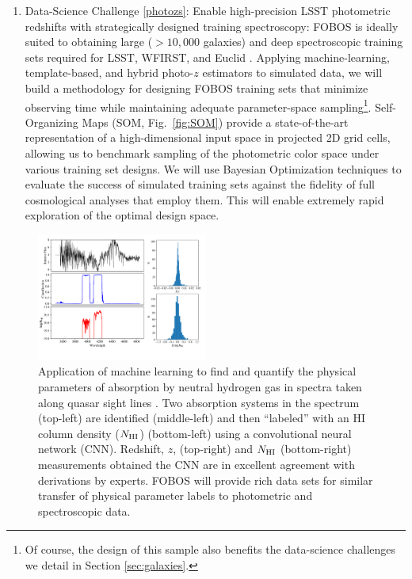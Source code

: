 \documentclass[oneside,11pt]{amsart}
\newcounter{chalno}
\newcommand{\chal}[1]{\refstepcounter{chalno}\label{#1}}
\begin{document}
\chal{photozs}
%
\begin{enumerate}[rightmargin=0.2cm,leftmargin=0.2cm]
%
\item[] {\textsf {\large Data-Science Challenge \ref{photozs}: Enable
high-precision LSST photometric redshifts with strategically designed
training spectroscopy:}}  FOBOS is ideally suited to obtaining large
($>10,000$ galaxies) and deep spectroscopic training sets required for
LSST, WFIRST, and Euclid \citep[see][] {newman15}.  Applying
machine-learning, template-based, and hybrid photo-$z$ estimators to
simulated data, we will build a methodology for designing FOBOS training
sets that minimize observing time while maintaining adequate
parameter-space sampling\footnote{
%
Of course, the design of this sample also benefits the data-science
challenges we detail in Section \ref{sec:galaxies}.}.
%
Self-Organizing Maps (SOM, Fig.~\ref {fig:SOM}) provide a
state-of-the-art representation of a high-dimensional input space in
projected 2D grid cells, allowing us to benchmark sampling of the
photometric color space under various training set designs.  We will use
Bayesian Optimization techniques to evaluate the success of simulated training sets against the fidelity of full  
cosmological analyses that employ them.  This will enable extremely rapid exploration of the
optimal design space.

\end{enumerate}

\begin{figure}\small
%
\includegraphics[width=0.5\textwidth]{figs/Parks_fig.pdf}
%
\caption{Application of machine learning to find and quantify the
physical parameters of absorption by neutral hydrogen gas in spectra
taken along quasar sight lines \citep[adapted from Figs 7 and 14
from][]{parks18}.  Two absorption systems in the spectrum (top-left) are
identified (middle-left) and then ``labeled'' with an HI column density
($N_{\rm HI}$) (bottom-left) using a convolutional neural network (CNN).
Redshift, $z$, (top-right) and $N_{\rm HI}$ (bottom-right) measurements
obtained the CNN are in excellent agreement with derivations by experts.
FOBOS will provide rich data sets for similar transfer of
physical parameter labels to photometric and spectroscopic data.}
%
\label{fig:absorber}
%
\end{figure}
\end{document}
